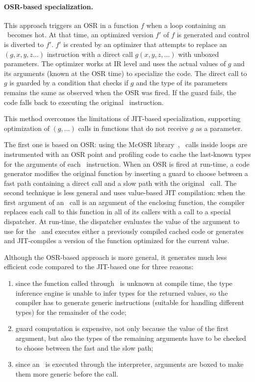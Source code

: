 \paragraph{OSR-based specialization.} This approach triggers an OSR in a function $f$ when a loop containing an \feval\ becomes hot. At that time, an optimized version $f'$ of $f$ is generated and control is diverted to $f'$. $f'$ is created by an optimizer that attempts to replace an \feval$(g,x,y,z...)$ instruction with a direct call $g(x,y,z,...)$ with unboxed parameters. The optimizer works at IR level and uses the actual values of $g$ and its arguments (known at the OSR time) to specialize the code. The direct call to $g$ is guarded by a condition that checks if $g$ and the type of its parameters remains the same as observed when the OSR was fired. If the guard fails, the code falls back to executing the original \feval\ instruction.

This method overcomes the limitations of JIT-based specialization, supporting optimization of \feval$(g,...)$ calls in functions that do not receive $g$ as a parameter. 
\fi

\ifdefined\fullver
The first one is based on OSR: using the McOSR library~\cite{lameed2013modular}, \feval\ calls inside loops are instrumented with an OSR point and profiling code to cache the last-known types for the arguments of each \feval\ instruction. When an OSR is fired at run-time, a code generator modifies the original function by inserting a guard to choose between a fast path containing a direct call and a slow path with the original \feval\ call. The second technique is less general and uses value-based JIT compilation: when the first argument of an \feval\ call is an argument of the enclosing function, the compiler replaces each call to this function in all of its callers with a call to a special dispatcher. At run-time, the dispatcher evaluates the value of the argument to use for the \feval\ and executes either a previously compiled cached code or generates and JIT-compiles a version of the function optimized for the current value.

Although the OSR-based approach is more general, it generates much less efficient code compared to the JIT-based one for three reasons:
\begin{enumerate}
\item since the function called through \feval\ is unknown at compile time, the type inference engine is unable to infer types for the returned values, so the compiler has to generate generic instructions (suitable for handling different types) for the remainder of the code;
\item guard computation is expensive, not only because the value of the first argument, but also the types of the remaining arguments have to be checked to choose between the fast and the slow path;
\item since an \feval\ is executed through the interpreter, arguments are boxed to make them more generic before the call.
\end{enumerate}

